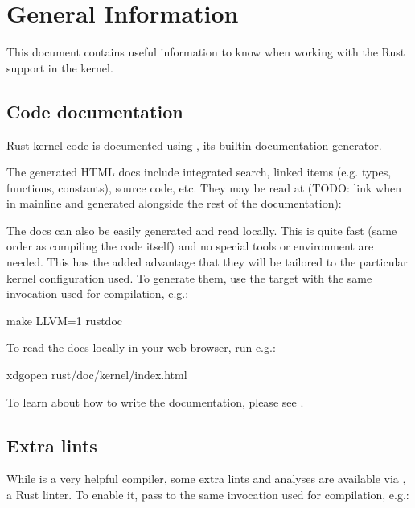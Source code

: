 \documentclass[a4paper,11pt,english]{sphinxmanual}
\begin{document}
\chapter{General Information}
\label{\detokenize{general-information:general-information}}\label{\detokenize{general-information::doc}}
This document contains useful information to know when working with
the Rust support in the kernel.


\section{Code documentation}
\label{\detokenize{general-information:code-documentation}}
Rust kernel code is documented using , its built\sphinxhyphen{}in documentation
generator.

The generated HTML docs include integrated search, linked items (e.g. types,
functions, constants), source code, etc. They may be read at (TODO: link when
in mainline and generated alongside the rest of the documentation):
\begin{quote}

\end{quote}

The docs can also be easily generated and read locally. This is quite fast
(same order as compiling the code itself) and no special tools or environment
are needed. This has the added advantage that they will be tailored to
the particular kernel configuration used. To generate them, use the 
target with the same invocation used for compilation, e.g.:

\begin{sphinxVerbatim}[commandchars=\\\{\}]
make LLVM=1 rustdoc
\end{sphinxVerbatim}

To read the docs locally in your web browser, run e.g.:

\begin{sphinxVerbatim}[commandchars=\\\{\}]
xdg\PYGZhy{}open rust/doc/kernel/index.html
\end{sphinxVerbatim}

To learn about how to write the documentation, please see {\hyperref[\detokenize{coding-guidelines::doc}]{}}.


\section{Extra lints}
\label{\detokenize{general-information:extra-lints}}
While  is a very helpful compiler, some extra lints and analyses are
available via , a Rust linter. To enable it, pass  to
the same invocation used for compilation, e.g.:
\end{document}
